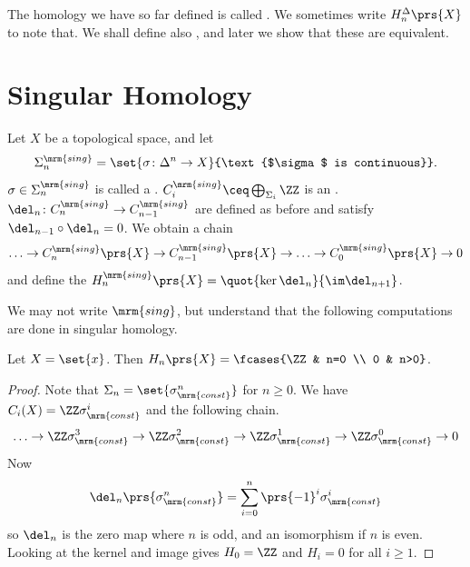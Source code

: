 \documentclass[10pt,a4paper,twoside,openany,hidelinks]{book}
\begin{document}
\begin{remark}
The homology we have so far defined is called . We sometimes write $H_n^{\Delta}\prs{X}$ to note that. We shall define also , and later we show that these are equivalent.
\end{remark}
\section{Singular Homology}
\begin{definition}
Let $X$ be a topological space, and let \[\Sigma_n^{\mrm{sing}} = \set{\sigma \colon \Delta^n \to X}{\text{$\sigma$ is continuous}}\text{.}\]
$\sigma \in \Sigma_n^{\mrm{sing}}$ is called a .
$C_i^{\mrm{sing}} \ceq \bigoplus_{\Sigma_i} \ZZ$ is an .
$\del_n \colon C_n^{\mrm{sing}} \to C_{n-1}^{\mrm{sing}}$ are defined as before and satisfy $\del_{n-1}\circ \del_n = 0$. We obtain a chain
\[\ldots \to C_n^{\mrm{sing}}\prs{X} \to C_{n-1}^{\mrm{sing}}\prs{X} \to \ldots \to C_0^{\mrm{sing}}\prs{X} \to 0\]
and define the 
$H_n^{\mrm{sing}}\prs{X} = \quot{\ker \del_n}{\im \del_{n+1}}$.
\end{definition}
\begin{remark}
We may not write $\mrm{sing}$, but understand that the following computations are done in singular homology. 
\end{remark}
\begin{lemma}
Let $X = \set{x}$. Then $H_n\prs{X} = \fcases{\ZZ & n=0 \\ 0 & n>0}$.
\end{lemma}
\begin{proof}
Note that $\Sigma_n = \set{\sigma^n_{\mrm{const}}}$ for $n \geq 0$.
We have $C_i(X) = \ZZ \sigma^i_{\mrm{const}}$ and the following chain.
\[\ldots \to \ZZ \sigma^3_{\mrm{const}} \to \ZZ \sigma^2_{\mrm{const}} \to \ZZ \sigma^1_{\mrm{const}} \to \ZZ \sigma^0_{\mrm{const}} \to 0\]
Now \[\del_n\prs{\sigma^n_{\mrm{const}}} = \sum_{i=0}^n \prs{-1}^i \sigma_{\mrm{const}}^{i}\]
so $\del_n$ is the zero map where $n$ is odd, and an isomorphism if $n$ is even.
Looking at the kernel and image gives $H_0 = \ZZ$ and $H_i = 0$ for all $i \geq 1$.
\end{proof}
\end{document}
